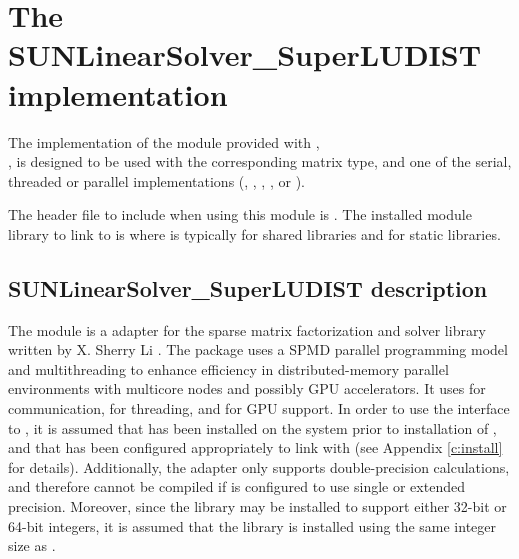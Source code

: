 \section{The SUNLinearSolver\_SuperLUDIST implementation}\label{ss:sunlinsol_sludist}

The {\superludist} implementation of the {\sunlinsol} module provided with
{\sundials},\\
\noindent{\sunlinsolsludist}, is designed to be used with the
corresponding {\sunmatslunrloc} matrix type, and one of the serial, threaded
or parallel {\nvector} implementations ({\nvecs}, {\nvecopenmp}, {\nvecpthreads},
{\nvecp}, or {\nvecph}).

The header file to include when using this module
is . The installed module
library to link to is
where  is typically  for shared libraries and
 for static libraries.


\subsection{SUNLinearSolver\_SuperLUDIST description}\label{ss:sunlinsol_sludist_description}

The {\sunlinsolsludist} module is a {\sunlinsol} adapter for the
{\superludist} sparse matrix factorization and solver library written by
X. Sherry Li \cite{SuperLUDIST_site,GDL:07,LD:03,SLUUG:99}.
The package uses a SPMD parallel programming model and multithreading
to enhance efficiency in distributed-memory parallel environments with
multicore nodes and possibly GPU accelerators. It uses {\mpi} for communication,
{\openmp} for threading, and {\cuda} for GPU support. In order to use the
{\sunlinsolsludist} interface to {\superludist}, it is assumed that {\superludist}
has been installed on the system prior to installation of {\sundials}, and
that {\sundials} has been configured appropriately to link with {\superludist}
(see Appendix \ref{c:install} for details). Additionally, the adapter only
supports double-precision calculations, and therefore cannot be compiled if {\sundials}
is configured to use single or extended precision. Moreover, since the {\superludist}
library may be installed to support either 32-bit or 64-bit integers,
it is assumed that the {\superludist} library is installed using the same
integer size as {\sundials}.

